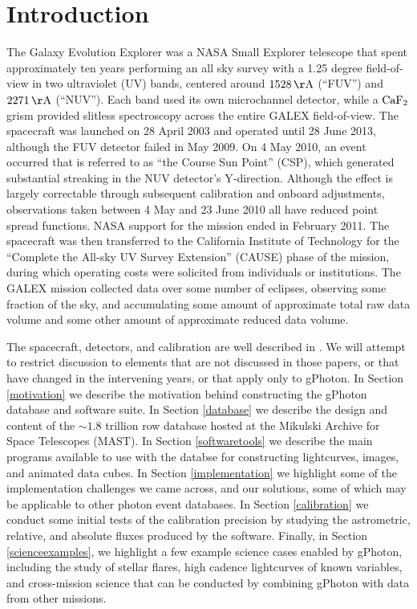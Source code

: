 \documentclass[preprint]{aastex}
\begin{document}
\section{Introduction}
The Galaxy Evolution Explorer \citep[GALEX;][]{mar2005} was a NASA Small Explorer telescope that spent approximately ten years performing an all sky survey with a 1.25 degree field-of-view in two ultraviolet (UV) bands, centered around $1528\,\rm{\AA}$ (“FUV”) and $2271\,\rm{\AA}$ (“NUV”). Each band used its own microchannel detector, while a $\rm{CaF_{2}}$ grism provided slitless spectroscopy across the entire GALEX field-of-view. The spacecraft was launched on 28 April 2003 and operated until 28 June 2013, although the FUV detector failed in May 2009. On 4 May 2010, an event occurred that is referred to as ``the Course Sun Point'' (CSP), which generated substantial streaking in the NUV detector's Y-direction. Although the effect is largely correctable through subsequent calibration and onboard adjustments, observations taken between 4 May and 23 June 2010 all have reduced point spread functions. NASA support for the mission ended in February 2011. The spacecraft was then transferred to the California Institute of Technology for the “Complete the All-sky UV Survey Extension” (CAUSE) phase of the mission, during which operating costs were solicited from individuals or institutions. The GALEX mission collected data over {\color{red}some number of eclipses}, observing {\color{red}some fraction of the sky}, and accumulating {\color{red}some amount of} approximate total raw data volume and {\color{red}some other amount of} approximate reduced data volume.

The spacecraft, detectors, and calibration are well described in \citet{mor2005,mor2007}. We will attempt to restrict discussion to elements that are not discussed in those papers, or that have changed in the intervening years, or that apply only to gPhoton.  In Section \ref{motivation} we describe the motivation behind constructing the gPhoton database and software suite.  In Section \ref{database} we describe the design and content of the $\sim 1.8$ trillion row database hosted at the Mikulski Archive for Space Telescopes (MAST).  In Section \ref{softwaretools} we describe the main programs available to use with the databse for constructing lightcurves, images, and animated data cubes.  In Section \ref{implementation} we highlight some of the implementation challenges we came across, and our solutions, some of which may be applicable to other photon event databases.  In Section \ref{calibration} we conduct some initial tests of the calibration precision by studying the astrometric, relative, and absolute fluxes produced by the software.  Finally, in Section \ref{scienceexamples}, we highlight a few example science cases enabled by gPhoton, including the study of stellar flares, high cadence lightcurves of known variables, and cross-mission science that can be conducted by combining gPhoton with data from other missions.
\end{document}
